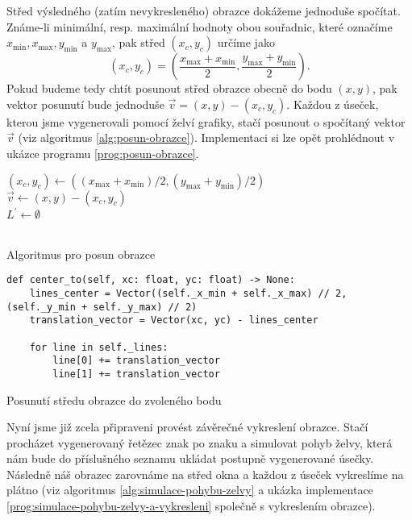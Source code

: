 Střed výsledného (zatím nevykresleného) obrazce dokážeme jednoduše spočítat. Známe-li minimální, resp. maximální hodnoty obou souřadnic, které označíme $x_{\text{min}},x_{\text{max}},y_{\text{min}}$ a $y_{\text{max}}$, pak střed $(x_c,y_c)$ určíme jako
\[(x_c,y_c)=\left(\dfrac{x_{\text{max}}+x_{\text{min}}}{2},\dfrac{y_{\text{max}}+y_{\text{min}}}{2}\right).\]
Pokud budeme tedy chtít posunout střed obrazce obecně do bodu $(x,y)$, pak vektor posunutí bude jednoduše $\vec{v}=(x,y)-(x_c,y_c)$. Každou z úseček, kterou jsme vygenerovali pomocí želví grafiky, stačí posunout o spočítaný vektor $\vec{v}$ (viz algoritmus \ref{alg:posun-obrazce}). Implementaci si lze opět prohlédnout v ukázce programu \ref{prog:posun-obrazce}.
\begin{algorithm}[h]
    $(x_c,y_c)\gets((x_{\text{max}}+x_{\text{min}})/2,(y_{\text{max}}+y_{\text{min}})/2)$\\
    $\vec{v}\gets(x,y)-(x_c,y_c)$\\
    $L^\prime\gets\emptyset$\\
    \\
    \caption{Algoritmus pro posun obrazce}
    \label{alg:posun-obrazce}
\end{algorithm}
\begin{program}[h]
\begin{lstlisting}[style=python]
def center_to(self, xc: float, yc: float) -> None:
    lines_center = Vector((self._x_min + self._x_max) // 2, (self._y_min + self._y_max) // 2)
    translation_vector = Vector(xc, yc) - lines_center

    for line in self._lines:
        line[0] += translation_vector
        line[1] += translation_vector
\end{lstlisting}
    \caption{Posunutí středu obrazce do zvoleného bodu}
    \label{prog:posun-obrazce}
\end{program}
Nyní jsme již zcela připraveni provést závěrečné vykreslení obrazce. Stačí procházet vygenerovaný řetězec znak po znaku a simulovat pohyb želvy, která nám bude do příslušného seznamu ukládat postupně vygenerované úsečky. Následně náš obrazec zarovnáme na střed okna a každou z úseček vykreslíme na plátno (viz algoritmus \ref{alg:simulace-pohybu-zelvy} a ukázka implementace \ref{prog:simulace-pohybu-zelvy-a-vykresleni} společně s vykreslením obrazce).
